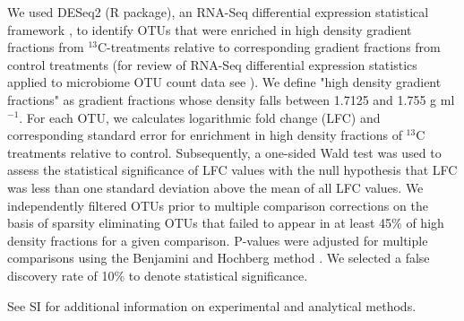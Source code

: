 We used DESeq2 (R package), an RNA-Seq differential expression statistical
framework \citep{love2014}, to identify OTUs that were enriched in high density
gradient fractions from $^{13}$C-treatments relative to corresponding gradient
fractions from control treatments (for review of RNA-Seq differential
expression statistics applied to microbiome OTU count data see
\citep{McMurdie2014}). We define "high density gradient fractions" as gradient
fractions whose density falls between 1.7125 and 1.755 g ml$^{-1}$. For each OTU,
we calculates logarithmic fold change (LFC) and corresponding standard error for
enrichment in high density fractions of $^{13}$C treatments relative to control.
Subsequently, a one-sided Wald test was used to assess the statistical significance
of LFC values with the null hypothesis that LFC was less than one standard deviation
above the mean of all LFC values. We independently filtered OTUs prior to multiple
comparison corrections on the basis of sparsity eliminating OTUs that failed to 
appear in at least 45\% of high density fractions for a given comparison. P-values
were adjusted for multiple comparisons using the Benjamini and Hochberg method
\citep{benjamini1995}. We selected a false discovery rate of 10\% to denote
statistical significance.



See SI for additional information on experimental and analytical methods.
